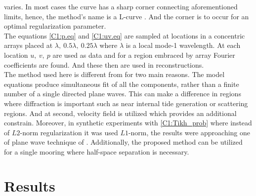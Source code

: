 \documentclass[12pt]{article}
\begin{document}
varies. In most cases the curve has a sharp corner connecting aforementioned limits, hence, the 
method's name is a L-curve \citep{hansen1999curve}. And the corner is to occur for an optimal 
regularization parameter.\\
The equations \eqref{C1:p.eq} and \eqref{C1:uv.eq} are sampled at locations in a concentric 
arrays placed at $\lambda,~0.5\lambda,~0.25\lambda$ where $\lambda$ is a local mode-1 wavelength. 
At each location $u,~v,~p$ are used as data and for a region embraced by array Fourier coefficients 
are found. And these then are used in reconstructions.\\
The method used here is different from \citep{zhao2010long} for two main reasons. The model 
equations produce simultaneous fit of all the components, rather than a finite number of a single 
directed plane waves. This can make a difference in regions where diffraction is important such as 
near internal tide generation or scattering regions. And at second, velocity field is utilized 
which provides an additional constrain. Moreover, in synthetic experiments with 
\eqref{C1:Tikh_prob} where instead of $L2$-norm regularization it was used $L1$-norm, the results 
were approaching one of plane wave technique of \citep{zhao2010long}. Additionally, the proposed 
method can be utilized for a single mooring where half-space separation is necessary.

\section{Results}
\end{document}

